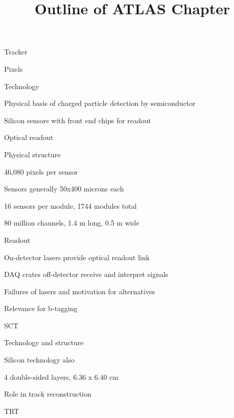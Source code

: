 \documentclass[11pt]{report}
\title{Outline of ATLAS Chapter}
\begin{document}
\begin{outline}

	\item Tracker
	\begin{outline}
		\item Pixels
		\begin{outline}
			\item Technology
			\begin{outline}
				\item Physical basis of charged particle detection by semiconductor
				\item Silicon sensors with front end chips for readout
				\item Optical readout
			\end{outline}
			\item Physical structure
			\begin{outline}
				\item 46,080 pixels per sensor
				\item Sensors generally 50x400 microns each
				\item 16 sensors per module, 1744 modules total
				\item 80 million channels, 1.4 m long, 0.5 m wide
			\end{outline}
			\item Readout
			\begin{outline}
				\item On-detector lasers provide optical readout link
				\item DAQ crates off-detector receive and interpret signals
				\item Failures of lasers and motivation for alternatives
			\end{outline}
			\item Relevance for b-tagging
		\end{outline}
		\item SCT
		\begin{outline}
			\item Technology and structure
			\begin{outline}
				\item Silicon technology also
				\item 4 double-sided layers, 6.36 x 6.40 cm
			\end{outline}
			\item Role in track reconstruction
		\end{outline}
		\item TRT
		\begin{outline}

\end{outline}
\end{outline}
\end{outline}
\end{document}

